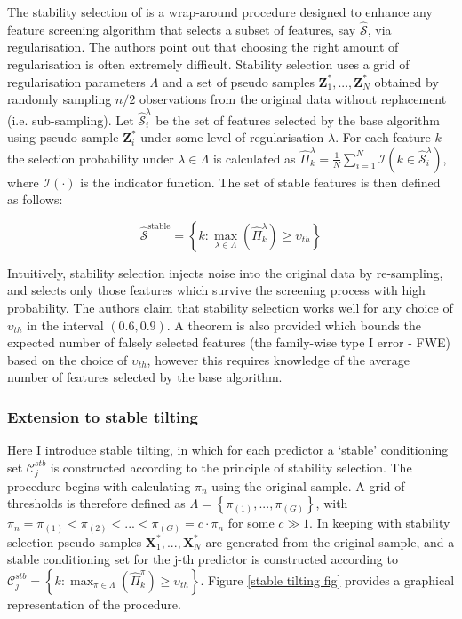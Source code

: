 \documentclass[11pt]{report}\usepackage[utf8]{inputenc}
\begin{document}
The stability selection of \cite{meinshausen2010stability} is a wrap-around procedure designed to enhance any feature screening algorithm that selects a subset of features, say $\widehat{\mathcal{S}}$, via regularisation. The authors point out that choosing the right amount of regularisation is often extremely difficult. Stability selection uses a grid of regularisation parameters $\Lambda$ and a set of pseudo samples $\boldsymbol{Z}^*_1,...,\boldsymbol{Z}^*_N$ obtained by randomly sampling $n/2$ observations from the original data without replacement (i.e. sub-sampling). Let $\widehat{\mathcal{S}}_i^{\lambda}$ be the set of features selected by the base algorithm using pseudo-sample $\boldsymbol{Z}_i^*$ under some level of regularisation $\lambda$. For each feature $k$ the selection probability under $\lambda \in \Lambda$ is calculated as $\widehat{\Pi}_k^{\lambda} = \frac{1}{N}\sum_{i=1}^{N}\mathcal{I}\left ( k \in \widehat{\mathcal{S}}_i^{\lambda} \right )$, where $\mathcal{I}(\cdot)$ is the indicator function. The set of stable features is then defined as follows:

\begin{equation*}
    \widehat{\mathcal{S}}^{\text{stable}} = \left \{ k:\max_{\lambda \in \Lambda} \left( \widehat{\Pi}^{\lambda}_k \right ) \geq \upsilon_{th}  \right \} 
\end{equation*}

Intuitively, stability selection injects noise into the original data by re-sampling, and selects only those features which survive the screening process with high probability. The authors claim that stability selection works well for any choice of $\upsilon_{th}$ in the interval $(0.6,0.9)$. A theorem is also provided which bounds the expected number of falsely selected features (the family-wise type I error - FWE) based on the choice of $\upsilon_{th}$, however this requires knowledge of the average number of features selected by the base algorithm. 

\subsubsection{Extension to stable tilting}

Here I introduce stable tilting, in which for each predictor a `stable' conditioning set $\mathcal{C}_j^{stb}$ is constructed according to the principle of stability selection. The procedure begins with calculating $\pi_{n}$ using the original sample. A grid of thresholds is therefore defined as $\Lambda = \left \{ \pi_{(1)},...,\pi_{(G)} \right \}$, with $\pi_{n} = \pi_{(1)}< \pi_{(2)}<...<\pi_{(G)} = c \cdot \pi_{n}$ for some $c \gg 1$. In keeping with stability selection pseudo-samples $\boldsymbol{X}_1^*,...,\boldsymbol{X}_N^*$ are generated from the original sample, and a stable conditioning set for the j-th predictor is constructed according to $\mathcal{C}_j^{stb} = \left \{ k : \max_{\pi \in \Lambda}\left ( \widehat{\Pi}_k^{\pi} \right ) \geq \upsilon_{th} \right \}$. Figure \ref{stable tilting fig} provides a graphical representation of the procedure. 
\end{document}
